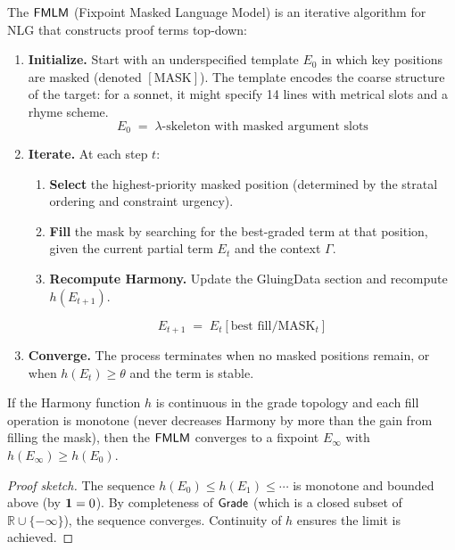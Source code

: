 \begin{construction}
\label{con:fmlm}
The $\mathsf{FMLM}$ (Fixpoint Masked Language Model) is an iterative
algorithm for NLG that constructs proof terms top-down:
\begin{enumerate}[label=\textbf{Step \arabic*:}]
\item \textbf{Initialize.}  Start with an underspecified template
  $E_0$ in which key positions are masked (denoted $[\mathrm{MASK}]$).
  The template encodes the coarse structure of the target: for a
  sonnet, it might specify 14 lines with metrical slots and a rhyme
  scheme.
  \[
    E_0 \;=\; \lambda\text{-skeleton with masked argument slots}
  \]
\item \textbf{Iterate.}  At each step $t$:
  \begin{enumerate}[label=(\alph*)]
  \item \textbf{Select} the highest-priority masked position
    (determined by the stratal ordering and constraint urgency).
  \item \textbf{Fill} the mask by searching for the
    best-graded term at that position, given the current partial
    term $E_t$ and the context $\Gamma$.
  \item \textbf{Recompute Harmony.}  Update the GluingData section
    and recompute $h(E_{t+1})$.
  \end{enumerate}
  \[
    E_{t+1} \;=\; E_t[\text{best fill} / \mathrm{MASK}_t]
  \]
\item \textbf{Converge.}  The process terminates when no masked
  positions remain, or when $h(E_t) \geq \theta$ and the term is
  stable.
\end{enumerate}
\end{construction}

\begin{theorem}
\label{thm:fmlm-convergence}
If the Harmony function $h$ is continuous in the grade topology and
each fill operation is monotone (never decreases Harmony by more
than the gain from filling the mask), then the $\mathsf{FMLM}$ converges to
a fixpoint $E_\infty$ with $h(E_\infty) \geq h(E_0)$.
\end{theorem}

\begin{proof}[Proof sketch]
The sequence $h(E_0) \leq h(E_1) \leq \cdots$ is monotone and
bounded above (by $\mathbf{1} = 0$).  By completeness of $\mathsf{Grade}$ (which
is a closed subset of $\mathbb{R} \cup \{-\infty\}$), the sequence
converges.  Continuity of $h$ ensures the limit is achieved.
\end{proof}

